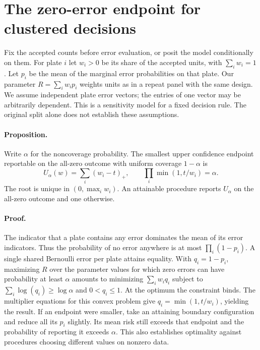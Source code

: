 \documentclass[11pt]{article}
\begin{document}
\section{The zero-error endpoint for clustered decisions}
Fix the accepted counts before error evaluation, or posit the model conditionally on them. For plate $i$ let $w_i>0$ be its share of the accepted units, with $\sum_i w_i=1$. Let $p_i$ be the mean of the marginal error probabilities on that plate. Our parameter $R=\sum_i w_i p_i$ weights units as in a repeat panel with the same design. We assume independent plate error vectors; the entries of one vector may be arbitrarily dependent. This is a sensitivity model for a fixed decision rule. The original split alone does not establish these assumptions.

\paragraph{Proposition.} Write $\alpha$ for the noncoverage probability. The smallest upper confidence endpoint reportable on the all-zero outcome with uniform coverage $1-\alpha$ is
\[
 U_\alpha(w)=\sum_i(w_i-t)_+,\qquad
 \prod_i\min(1,t/w_i)=\alpha.
\]
The root is unique in $(0,\max_i w_i)$. An attainable procedure reports $U_\alpha$ on the all-zero outcome and one otherwise.

\paragraph{Proof.} The indicator that a plate contains any error dominates the mean of its error indicators. Thus the probability of no error anywhere is at most $\prod_i(1-p_i)$. A single shared Bernoulli error per plate attains equality. With $q_i=1-p_i$, maximizing $R$ over the parameter values for which zero errors can have probability at least $\alpha$ amounts to minimizing $\sum_i w_i q_i$ subject to $\sum_i\log(q_i)\ge\log\alpha$ and $0<q_i\le1$. At the optimum the constraint binds. The multiplier equations for this convex problem give $q_i=\min(1,t/w_i)$, yielding the result. If an endpoint were smaller, take an attaining boundary configuration and reduce all its $p_i$ slightly. Its mean risk still exceeds that endpoint and the probability of reporting it exceeds $\alpha$. This also establishes optimality against procedures choosing different values on nonzero data.
\end{document}
